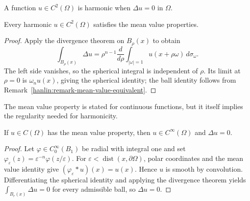 \begin{definition}\label{hanlin:def-harmonic}
A function $u\in C^2(\Omega)$ is harmonic when $\Delta u=0$ in $\Omega$.
\end{definition}

\begin{theorem}\label{hanlin:thm-harmonic-mean-value}
Every harmonic $u\in C^2(\Omega)$ satisfies the mean value properties.
\end{theorem}
\begin{proof}
\sketch Apply the divergence theorem on $B_\rho(x)$ to obtain
\[
\int_{B_\rho(x)}\Delta u=\rho^{n-1}\frac d{d\rho}
\int_{|\omega|=1}u(x+\rho\omega)\,d\sigma_\omega.
\]
The left side vanishes, so the spherical integral is independent of $\rho$.
Its limit at $\rho=0$ is $\omega_nu(x)$, giving the spherical identity; the
ball identity follows from Remark~\ref{hanlin:remark-mean-value-equivalent}.
\end{proof}

\begin{remark}\label{hanlin:remark-mvp-not-smooth}
The mean value property is stated for continuous functions, but it itself
implies the regularity needed for harmonicity.
\end{remark}

\begin{theorem}\label{hanlin:thm-mean-value-harmonic}
If $u\in C(\Omega)$ has the mean value property, then $u\in C^\infty(\Omega)$
and $\Delta u=0$.
\end{theorem}
\begin{proof}
\sketch Let $\varphi\in C_0^\infty(B_1)$ be radial with integral one and set
$\varphi_\varepsilon(z)=\varepsilon^{-n}\varphi(z/\varepsilon)$. For
$\varepsilon<\operatorname{dist}(x,\partial\Omega)$, polar coordinates and
the mean value identity give $(\varphi_\varepsilon*u)(x)=u(x)$. Hence $u$ is
smooth by convolution. Differentiating the spherical identity and applying the
divergence theorem yields $\int_{B_r(x)}\Delta u=0$ for every admissible ball,
so $\Delta u=0$.
\end{proof}

